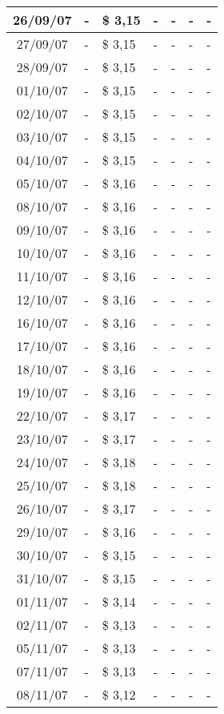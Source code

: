 \begin{center}
\begin{longtable}{|c|p{1.5cm}|p{1.5cm}|p{1.5cm}|p{1.5cm}|p{1.5cm}|p{1.5cm}|}
26/09/07 & - & \$ 3,15 & - & - & - & - \\ \hline
27/09/07 & - & \$ 3,15 & - & - & - & - \\ \hline
28/09/07 & - & \$ 3,15 & - & - & - & - \\ \hline
01/10/07 & - & \$ 3,15 & - & - & - & - \\ \hline
02/10/07 & - & \$ 3,15 & - & - & - & - \\ \hline
03/10/07 & - & \$ 3,15 & - & - & - & - \\ \hline
04/10/07 & - & \$ 3,15 & - & - & - & - \\ \hline
05/10/07 & - & \$ 3,16 & - & - & - & - \\ \hline
08/10/07 & - & \$ 3,16 & - & - & - & - \\ \hline
09/10/07 & - & \$ 3,16 & - & - & - & - \\ \hline
10/10/07 & - & \$ 3,16 & - & - & - & - \\ \hline
11/10/07 & - & \$ 3,16 & - & - & - & - \\ \hline
12/10/07 & - & \$ 3,16 & - & - & - & - \\ \hline
16/10/07 & - & \$ 3,16 & - & - & - & - \\ \hline
17/10/07 & - & \$ 3,16 & - & - & - & - \\ \hline
18/10/07 & - & \$ 3,16 & - & - & - & - \\ \hline
19/10/07 & - & \$ 3,16 & - & - & - & - \\ \hline
22/10/07 & - & \$ 3,17 & - & - & - & - \\ \hline
23/10/07 & - & \$ 3,17 & - & - & - & - \\ \hline
24/10/07 & - & \$ 3,18 & - & - & - & - \\ \hline
25/10/07 & - & \$ 3,18 & - & - & - & - \\ \hline
26/10/07 & - & \$ 3,17 & - & - & - & - \\ \hline
29/10/07 & - & \$ 3,16 & - & - & - & - \\ \hline
30/10/07 & - & \$ 3,15 & - & - & - & - \\ \hline
31/10/07 & - & \$ 3,15 & - & - & - & - \\ \hline
01/11/07 & - & \$ 3,14 & - & - & - & - \\ \hline
02/11/07 & - & \$ 3,13 & - & - & - & - \\ \hline
05/11/07 & - & \$ 3,13 & - & - & - & - \\ \hline
07/11/07 & - & \$ 3,13 & - & - & - & - \\ \hline
08/11/07 & - & \$ 3,12 & - & - & - & - \\ \hline

\end{longtable}
\end{center}
